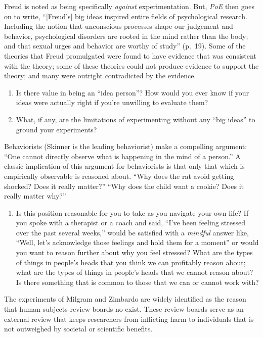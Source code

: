 \documentclass[
]{article}
\providecommand{\tightlist}{%
  \setlength{\itemsep}{0pt}\setlength{\parskip}{0pt}}
\theoremstyle{definition}
\theoremstyle{definition}
\theoremstyle{definition}
\theoremstyle{definition}
\theoremstyle{remark}
\begin{document}
Freud is noted as being specifically \emph{against} experimentation. But, \emph{PoE} then goes on to write, ``{[}Freud's{]} big ideas inspired entire fields of psychological research. Including the notion that unconscious processes shape our judgement and behavior, psychological disorders are rooted in the mind rather than the body; and that sexual urges and behavior are worthy of study'' (p.~19). Some of the theories that Freud promulgated were found to have evidence that was consistent with the theory; some of these theories could not produce evidence to support the theory; and many were outright contradicted by the evidence.

\begin{enumerate}
\def\labelenumi{\arabic{enumi}.}
\tightlist
\item
  Is there value in being an ``idea person''? How would you ever know if your ideas were actually right if you're unwilling to evaluate them?
\item
  What, if any, are the limitations of experimenting without any ``big ideas'' to ground your experiments?
\end{enumerate}

Behaviorists (Skinner is the leading behaviorist) make a compelling argument: ``One cannot directly observe what is happening in the mind of a person.'' A classic implication of this argument for behaviorists is that only that which is empirically observable is reasoned about. ``Why does the rat avoid getting shocked? Does it really matter?'' ``Why does the child want a cookie? Does it really matter why?''

\begin{enumerate}
\def\labelenumi{\arabic{enumi}.}
\tightlist
\item
  Is this position reasonable for you to take as you navigate your own life? If you spoke with a therapist or a coach and said, ``I've been feeling stressed over the past several weeks,'' would be satisfied with a \emph{mindful} answer like, ``Well, let's acknowledge those feelings and hold them for a moment'' or would you want to reason further about why you feel stressed? What are the types of things in people's heads that you think we can profitably reason about; what are the types of things in people's heads that we cannot reason about? Is there something that is common to those that we can or cannot work with?
\end{enumerate}

The experiments of Milgram and Zimbardo are widely identified as the reason that human-subjects review boards no exist. These review boards serve as an external review that keeps researchers from inflicting harm to individuals that is not outweighed by societal or scientific benefits.
\end{document}
